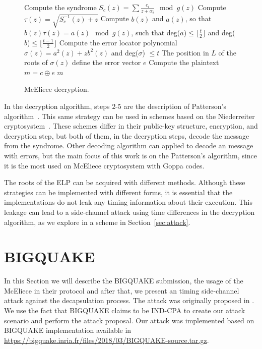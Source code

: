 \begin{figure}[ht]
\centering
    \begin{algorithm}[H]
     Compute the syndrome $S_c(z) = \sum{\frac{c_i}{z+\alpha_i}} \mod g(z)$\;
     Compute $\tau(z) = \sqrt{S^{-1}_{c}(z)+z}$\;
     Compute $b(z)$ and $a(z)$, so that $b(z)\tau(z) = a(z) \mod g(z)$, such that deg($a$)$\leq \lfloor \frac{t}{2} \rfloor$ and deg($b$)$\leq \lfloor \frac{t-1}{2} \rfloor$\;
     Compute the error locator polynomial $\sigma(z) = a^2(z) + zb^2(z)$ and deg($\sigma$) $\leq t$\;
     The position in $L$ of the roots of $\sigma(z)$ define the error vector $e$\;
     Compute the plaintext $m = c \oplus e$\;
     \Return $m$\;
     \caption{McEliece decryption.}\label{alg:3}
    \end{algorithm}
\end{figure}


In the decryption algorithm, steps $2$-$5$ are the description of Patterson's algorithm~\cite{patterson1975algebraic}. This same strategy can be used in schemes based on the Niederreiter cryptosystem~\cite{niederreiter}. These schemes differ in their public-key structure, encryption, and decryption step, but both of them, in the decryption steps, decode the message from the syndrome. Other decoding algorithm can applied to decode an message with errors, but the main focus of this work is on the Patterson's algorithm, since it is the most used on McEliece cryptosystem with Goppa codes. 

The roots of the ELP can be acquired with different methods. Although these strategies can be implemented with different forms, it is essential that the implementations do not leak any timing information about their execution. This leakage can lead to a side-channel attack using time differences in the decryption algorithm, as we explore in a scheme in Section~\ref{sec:attack}.

\section{BIGQUAKE}
In this Section we will describe the BIGQUAKE submission, the usage of the McEliece in their protocol and after that, we present an timing side-channel attack against the decapsulation process. The attack was originally proposed in \cite{shoufan2009timing}. We use the fact that BIGQUAKE claims to be IND-CPA to create our attack scenario and perform the attack proposal. Our attack was implemented based on BIGQUAKE implementation available in \url{https://bigquake.inria.fr/files/2018/03/BIGQUAKE-source.tar.gz}.

